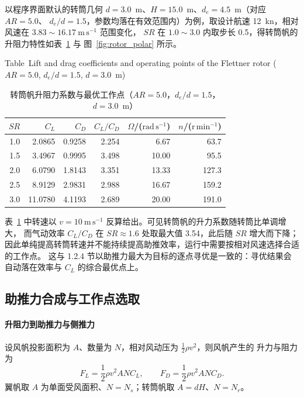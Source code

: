 \documentclass[UTF8,a4paper,twoside,zihao=5,fontset=windows]{ctexart}
\begin{document}
以程序界面默认的转筒几何 $d=3.0$~m、$H=15.0$~m、$d_e=4.5$~m（对应 $AR=5.0$、
$d_e/d=1.5$，参数均落在有效范围内）为例，取设计航速 12~kn，相对风速在 $3.83\sim16.17\ \mathrm{m\,s^{-1}}$ 范围变化，
$SR$ 在 $1.0\sim3.0$ 内取步长 0.5，得转筒帆的升阻力特性如表~\ref{tab:rotor_polar} 与
图~\ref{fig:rotor_polar} 所示。

\begin{table}[htbp]
\centering
\small
\setlength{\tabcolsep}{6pt}
\renewcommand{\arraystretch}{1.35}
\caption{转筒帆升阻力系数与最优工作点（$AR=5.0$，$d_e/d=1.5$，$d=3.0$~m）}
{\small Table~\thetable\quad Lift and drag coefficients and operating points of the Flettner rotor ($AR=5.0$, $d_e/d=1.5$, $d=3.0$~m)\par}
\smallskip
\label{tab:rotor_polar}
\begin{tabular}{@{}rrrrrr@{}}
\toprule
$SR$ & $C_L$ & $C_D$ & $C_L/C_D$ & $\Omega$/($\mathrm{rad\,s^{-1}}$) & $n$/($\mathrm{r\,min^{-1}}$) \\
\midrule
1.0 & 2.0865 & 0.9258 & 2.254 & 6.67 & 63.7 \\
1.5 & 3.4967 & 0.9995 & 3.498 & 10.00 & 95.5 \\
2.0 & 6.0790 & 1.8143 & 3.351 & 13.33 & 127.3 \\
2.5 & 8.9129 & 2.9831 & 2.988 & 16.67 & 159.2 \\
3.0 & 11.0780 & 4.1193 & 2.689 & 20.00 & 191.0 \\
\bottomrule
\end{tabular}
\end{table}
\FloatBarrier

表~\ref{tab:rotor_polar} 中转速以
$v=10\ \mathrm{m\,s^{-1}}$ 反算给出。可见转筒帆的升力系数随转筒比单调增大，
而气动效率 $C_L/C_D$ 在 $SR\approx1.6$ 处取最大值 3.54，此后随 $SR$ 增大而下降；
因此单纯提高转筒转速并不能持续提高助推效率，运行中需要按相对风速选择合适的工作点。
这与 1.2.4 节以助推力最大为目标的逐点寻优是一致的：寻优结果会自动落在效率与
$C_L$ 的综合最优点上。

\subsection{助推力合成与工作点选取}
\label{sec:sail_operating_point}

\paragraph{升阻力到助推力与侧推力}
设风帆投影面积为 $A$、数量为 $N$，相对风动压为 $\tfrac{1}{2}\rho v^2$，则风帆产生的
升力与阻力为
\begin{equation}
F_L=\frac{1}{2}\rho v^2ANC_L,
\qquad
F_D=\frac{1}{2}\rho v^2ANC_D .
\label{eq:lift_drag}
\end{equation}
翼帆取 $A$ 为单面受风面积、$N=N_s$；转筒帆取 $A=dH$、$N=N_r$。
\end{document}
